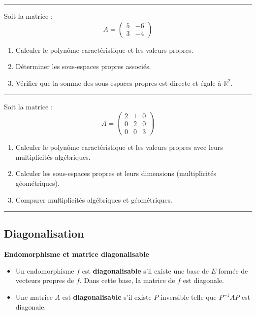 \documentclass[../PolyS4.tex]{subfiles}
\begin{document}
\vspace{1em}
\hrule
\vspace{1em}


Soit la matrice :
$$A = \begin{pmatrix}
5 & -6 \\
3 & -4
\end{pmatrix}$$
\begin{enumerate}
    \item Calculer le polynôme caractéristique et les valeurs propres.
    \item Déterminer les sous-espaces propres associés.
    \item Vérifier que la somme des sous-espaces propres est directe et égale à $\mathbb{R}^2$.
\end{enumerate}

\vspace{1em}
\hrule
\vspace{1em}


Soit la matrice :
$$A = \begin{pmatrix}
2 & 1 & 0 \\
0 & 2 & 0 \\
0 & 0 & 3
\end{pmatrix}$$
\begin{enumerate}
    \item Calculer le polynôme caractéristique et les valeurs propres avec leurs multiplicités algébriques.
    \item Calculer les sous-espaces propres et leurs dimensions (multiplicités géométriques).
    \item Comparer multiplicités algébriques et géométriques.
\end{enumerate}

\vspace{1em}
\hrule
\vspace{1em}

\subsection{Diagonalisation}

\begin{Def}\textbf{Endomorphisme et matrice diagonalisable}\\

\begin{itemize}
    \item Un endomorphisme $f$ est \textbf{diagonalisable} s'il existe une base de $E$ formée de vecteurs propres de $f$. Dans cette base, la matrice de $f$ est diagonale.
    \item Une matrice $A$ est \textbf{diagonalisable} s'il existe $P$ inversible telle que $P^{-1}AP$ est diagonale.
\end{itemize}
\end{Def}
\end{document}
